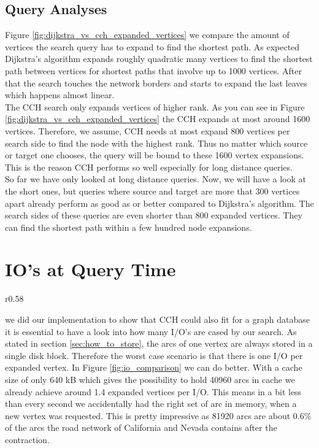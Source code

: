 

\subsection{Query Analyses}

Figure \ref{fig:dijkstra_vs_cch_expanded_vertices} we compare the amount of vertices the search query has to expand to find the shortest path.
As expected Dijkstra's algorithm expands roughly quadratic many vertices to find the shortest path between vertices for shortest paths that involve up to 1000 vertices.
After that the search touches the network borders and starts to expand the last leaves which happens almost linear.\\
The CCH search only expands vertices of higher rank.
As you can see in Figure \ref{fig:dijkstra_vs_cch_expanded_vertices} the CCH expands at most around 1600 vertices.
Therefore, we assume, CCH needs at most expand 800 vertices per search side to find the node with the highest rank.
Thus no matter which source or target one chooses, the query will be bound to these 1600 vertex expansions.
This is the reason CCH performs so well especially for long distance queries.
\\
So far we have only looked at long distance queries.
Now, we will have a look at the short ones, but queries where source and target are more that 300 vertices apart already perform as good as or better compared to Dijkstra's algorithm.
The search sides of these queries are even shorter than 800 expanded vertices.
They can find the shortest path within a few hundred node expansions.



\section{IO's at Query Time}

\begin{wrapfigure}{r}{0.58\textwidth}    
    
    \caption{I/O's over Expanded Vertices for 40kB cache size per search side.}
    \label{fig:io_comparison}
\end{wrapfigure}

we did our implementation to show that CCH could also fit for a graph database it is essential to have a look into how many I/O's are cased by our search.
As stated in section \ref{sec:how_to_store}, the arcs of one vertex are always stored in a single disk block.
Therefore the worst case scenario is that there is one I/O per expanded vertex.
In Figure \ref{fig:io_comparison} we can do better.
With a cache size of only 640 kB which gives the possibility to hold 40960 arcs in cache we already achieve around 1.4 expanded vertices per I/O.
This means in a bit less than every second we accidentally had the right set of arc in memory, when a new vertex was requested.
This is pretty impressive as 81920 arcs are about 0.6\%  of the arcs the road network of California and Nevada contains after the contraction.


